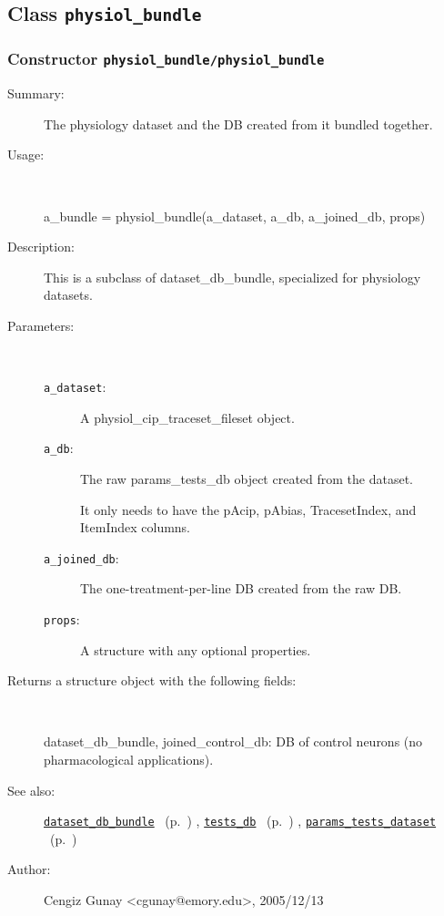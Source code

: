 \subsection{Class \texttt{physiol\_bundle}}%
%
\label{ref_physiol_bundle}%
\hypertarget{ref_physiol_bundle}{}%
\subsubsection[Constructor \texttt{physiol\_bundle}]{Constructor \texttt{physiol\_bundle/physiol\_bundle}}%
%
\label{ref_physiol_bundle__physiol_bundle}%
\hypertarget{ref_physiol_bundle__physiol_bundle}{}%
\begin{description}
\item[Summary:]The physiology dataset and the DB created from it bundled together.
%
\item[Usage:]~%
\begin{lyxcode}%
a\_bundle = physiol\_bundle(a\_dataset, a\_db, a\_joined\_db, props)
%
\end{lyxcode}%
%
\item[Description:]%
This is a subclass of dataset\_db\_bundle, specialized for physiology datasets. 
\item[Parameters:]~
\begin{description}%
\item[\texttt{a\_dataset}:]
 A physiol\_cip\_traceset\_fileset object.
\item[\texttt{a\_db}:]
 The raw params\_tests\_db object created from the dataset. 

It only needs to have the pAcip, pAbias, TracesetIndex, and ItemIndex columns.\item[\texttt{a\_joined\_db}:]
 The one-treatment-per-line DB created from the raw DB.
\item[\texttt{props}:]
 A structure with any optional properties.
\end{description}%
%
\item[Returns a structure object with the following fields:]~

	dataset\_db\_bundle, 
	joined\_control\_db: DB of control neurons (no pharmacological applications).
%
%
\item[See also:]%
\hyperlink{ref_dataset_db_bundle}{\texttt{dataset\_db\_bundle}}%
\ (p.~\pageref{ref_dataset_db_bundle})%
%
, \hyperlink{ref_tests_db}{\texttt{tests\_db}}%
\ (p.~\pageref{ref_tests_db})%
%
, \hyperlink{ref_params_tests_dataset}{\texttt{params\_tests\_dataset}}%
\ (p.~\pageref{ref_params_tests_dataset})%
%
%
\item[Author:]%
Cengiz Gunay <cgunay@emory.edu>, 2005/12/13%
\end{description}
\methodline%
